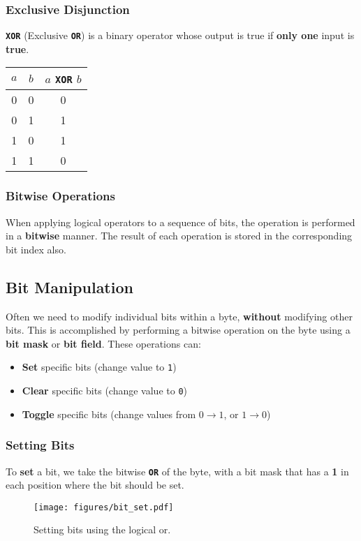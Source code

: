 \documentclass{article}
\newcommand{\keywordinline}[1]{\textcolor[rgb]{0.00,0.50,0.00}{\textbf{\texttt{#1}}}}
\begin{document}
\subsubsection{Exclusive Disjunction}
\keywordinline{XOR} (Exclusive \keywordinline{OR}) is a binary operator whose output is true if \textbf{only one} input is \textbf{true}.
\begin{table}[H]
    \centering
    \begin{tabular}{c c c}
        \toprule
        \textbf{\(a\)} & \textbf{\(b\)} & \(a\) \keywordinline{XOR} \(b\) \\
        \midrule
        0              & 0              & 0                               \\
        0              & 1              & 1                               \\
        1              & 0              & 1                               \\
        1              & 1              & 0                               \\
        \bottomrule
    \end{tabular}
\end{table}
\subsubsection{Bitwise Operations}
When applying logical operators to a sequence of bits, the operation is
performed in a \textbf{bitwise} manner. The result of each operation is
stored in the corresponding bit index also.
\subsection{Bit Manipulation}
Often we need to modify individual bits within a byte, \textbf{without}
modifying other bits. This is accomplished by performing a bitwise
operation on the byte using a \textbf{bit mask} or \textbf{bit field}.
These operations can:
\begin{itemize}
    \item \textbf{Set} specific bits (change value to \texttt{1})
    \item \textbf{Clear} specific bits (change value to \texttt{0})
    \item \textbf{Toggle} specific bits (change values from \(0 \to 1\), or \(1 \to 0\))
\end{itemize}
\subsubsection{Setting Bits}
To \textbf{set} a bit, we take the bitwise \keywordinline{OR} of the
byte, with a bit mask that has a \textbf{1} in each position where the
bit should be set.
\begin{figure}[H]
    \centering
    \texttt{[image: figures/bit\_set.pdf]}
    \caption{Setting bits using the logical or.} %
\end{figure}
\end{document}
